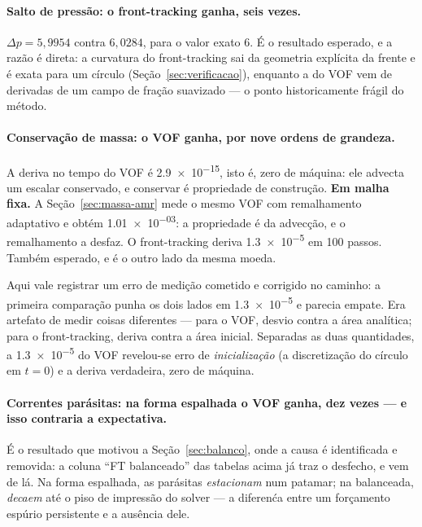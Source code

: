 \paragraph{Salto de press\~ao: o front-tracking ganha, seis vezes.}
$\Delta p = 5{,}9954$ contra $6{,}0284$, para o valor exato $6$. \'E o resultado
esperado, e a raz\~ao \'e direta: a curvatura do front-tracking sai da geometria
expl\'icita da frente e \'e exata para um c\'irculo (Se\c{c}\~ao~\ref{sec:verificacao}),
enquanto a do VOF vem de derivadas de um campo de fra\c{c}\~ao suavizado --- o
ponto historicamente fr\'agil do m\'etodo.

\paragraph{Conserva\c{c}\~ao de massa: o VOF ganha, por nove ordens de grandeza.}
A deriva no tempo do VOF \'e \num{2.9e-15}, isto \'e, zero de m\'aquina: ele
advecta um escalar conservado, e conservar \'e propriedade de constru\c{c}\~ao.
\textbf{Em malha fixa.} A Se\c{c}\~ao~\ref{sec:massa-amr} mede o mesmo VOF com
remalhamento adaptativo e obt\'em \num{1.01e-03}: a propriedade \'e da
advec\c{c}\~ao, e o remalhamento a desfaz.
O front-tracking deriva \num{1.3e-5} em 100 passos. Tamb\'em esperado, e \'e o
outro lado da mesma moeda.

Aqui vale registrar um erro de medi\c{c}\~ao cometido e corrigido no caminho:
a primeira compara\c{c}\~ao punha os dois lados em \num{1.3e-5} e parecia empate.
Era artefato de medir coisas diferentes --- para o VOF, desvio contra a \'area
anal\'itica; para o front-tracking, deriva contra a \'area inicial. Separadas as
duas quantidades, a \num{1.3e-5} do VOF revelou-se erro de \emph{inicializa\c{c}\~ao}
(a discretiza\c{c}\~ao do c\'irculo em $t=0$) e a deriva verdadeira, zero de
m\'aquina.

\paragraph{Correntes par\'asitas: na forma espalhada o VOF ganha, dez vezes ---
e isso contraria a expectativa.} \'E o resultado que motivou a
Se\c{c}\~ao~\ref{sec:balanco}, onde a causa \'e identificada e removida: a
coluna ``FT balanceado'' das tabelas acima j\'a traz o desfecho, e vem de l\'a.
Na forma espalhada, as par\'asitas \emph{estacionam} num patamar; na balanceada,
\emph{decaem} at\'e o piso de impress\~ao do solver --- a diferen\'ca entre um
for\c{c}amento esp\'urio persistente e a aus\^encia dele.


